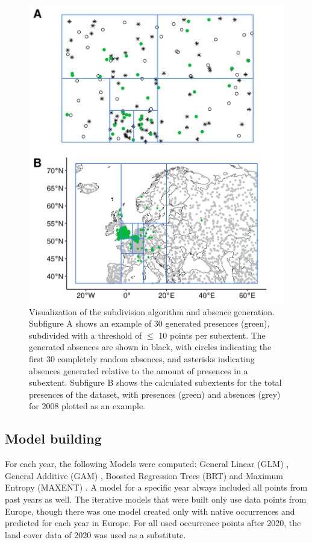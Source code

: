 \documentclass[12pt,a4paper]{article}
\begin{document}
\begin{figure}[!h]
    \centering
    \includegraphics[width = 0.8\linewidth]{"../../R/figures/ext-subdiv.png"}
    \caption{\label{fig:ext_subdiv} Visualization of the subdivision algorithm and absence generation. Subfigure A shows an example of 30 generated presences (green), subdivided with a threshold of $\leq$ 10 points per subextent. The generated absences are shown in black, with circles indicating the first 30 completely random absences, and asterisks indicating absences generated relative to the amount of presences in a subextent. Subfigure B shows the calculated subextents for the total presences of the dataset, with presences (green) and absences (grey) for 2008 plotted as an example.}
\end{figure}

\subsection{Model building} \label{ssec:modelbuilding}
For each year, the following Models were computed: General Linear (GLM) \autocite{guisan2002glm-gam}, General Additive (GAM) \autocite{guisan2002glm-gam}, Boosted Regression Trees (BRT) \autocite{elith2008brt} and Maximum Entropy (MAXENT) \autocite{phillips2017maxnet}.
A model for a specific year always included all points from past years as well.
The iterative models that were built only use data points from Europe, though there was one model created only with native occurrences and predicted for each year in Europe.
For all used occurrence points after 2020, the land cover data of 2020 was used as a substitute.
\end{document}
